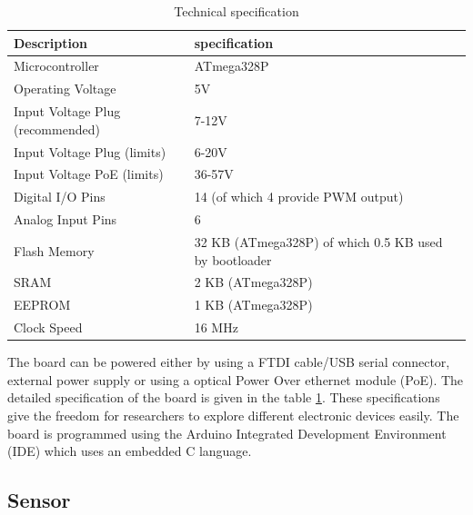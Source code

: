 \begin{table}[h]
  
  
  \begin{tabularx}{\columnwidth}{X|X}
      \hline
      Description                 & specification    \\
      \hline
      Microcontroller & ATmega328P \\
      Operating Voltage & 5V\\
      Input Voltage Plug (recommended) & 7-12V\\
      Input Voltage Plug (limits)       & 6-20V\\
      Input Voltage PoE (limits)        & 36-57V \\
      Digital I/O Pins    & 14 (of which 4 provide PWM output)     \\
      Analog Input Pins & 6\\
      Flash Memory & 32 KB (ATmega328P) of which 0.5 KB used by bootloader\\
      SRAM     & 2 KB (ATmega328P)\\
      EEPROM   & 1 KB (ATmega328P) \\
      Clock Speed  & 16 MHz\\
      \hline
    
  \end{tabularx}
  \caption{Technical specification}
  \label{table:Technical specification}
\end{table}
 
The board can be powered either by using a FTDI cable/USB serial connector, external power supply or using a optical Power Over ethernet module (PoE). The detailed specification\cite{Guti2017} of the board is given in the table \ref{table:Technical specification}. These specifications give the freedom for researchers to explore different electronic devices easily. The board is programmed using the Arduino Integrated Development Environment (IDE) which uses an embedded C language.




\subsection{Sensor}


